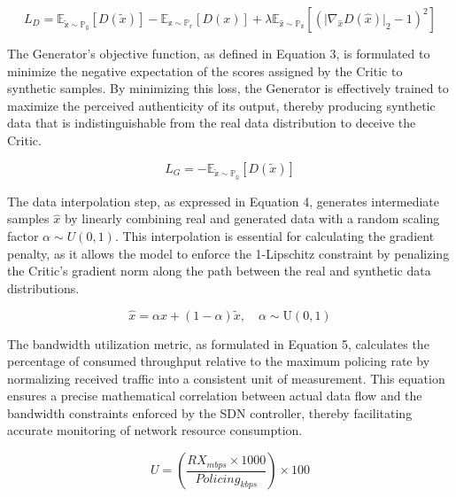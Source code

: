 \begin{equation}\label{eq:2}
L_{D} = \mathbb{E}_{\widetilde{\mathbb{x}} \sim \mathbb{P}_{\mathbb{g}}}\left\lbrack D\left( \widetilde{x} \right) \right\rbrack - \mathbb{E}_{\mathbb{x} \sim \mathbb{P}_{\mathbb{r}}}\left\lbrack D(x) \right\rbrack + \lambda\mathbb{E}_{\widehat{\mathbb{x}} \sim \mathbb{P}_{\widehat{\mathbb{x}}}}\left\lbrack \left( \text{|}\nabla_{\widehat{x}}D\left( \widehat{x} \right)\text{|}_{2} - 1 \right)^{2} \right\rbrack
\end{equation}

The Generator's objective function, as defined in Equation 3, is formulated to minimize the negative expectation of the scores assigned by the Critic to synthetic samples. By minimizing this loss, the Generator is effectively trained to maximize the perceived authenticity of its output, thereby producing synthetic data that is indistinguishable from the real data distribution to deceive the Critic.

\begin{equation}\label{eq:3}
L_{G} = - \mathbb{E}_{\widetilde{\mathbb{x}} \sim \mathbb{P}_{\mathbb{g}}}\left\lbrack D\left( \widetilde{x} \right) \right\rbrack
\end{equation}

The data interpolation step, as expressed in Equation 4, generates intermediate samples \(\widehat{x}\) by linearly combining real and generated data with a random scaling factor \(\alpha \sim U(0,1)\). This interpolation is essential for calculating the gradient penalty, as it allows the model to enforce the 1-Lipschitz constraint by penalizing the Critic's gradient norm along the path between the real and synthetic data distributions.

\begin{equation}\label{eq:4}
\widehat{x} = \alpha x + (1 - \alpha)\widetilde{x},\quad\alpha \sim \text{U}(0,1)
\end{equation}

The bandwidth utilization metric, as formulated in Equation 5, calculates the percentage of consumed throughput relative to the maximum policing rate by normalizing received traffic into a consistent unit of measurement. This equation ensures a precise mathematical correlation between actual data flow and the bandwidth constraints enforced by the SDN controller, thereby facilitating accurate monitoring of network resource consumption.

\begin{equation}\label{eq:5}
U = \left( \frac{RX_{mbps} \times 1000}{Policing_{kbps}} \right) \times 100
\end{equation}

